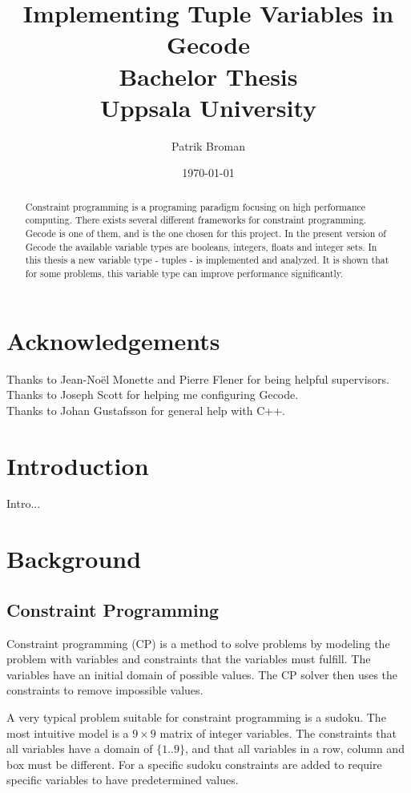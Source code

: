 \documentclass[a4paper,11pt]{article}
\title{\textbf{Implementing Tuple Variables in Gecode \\
	Bachelor Thesis \\
    Uppsala University  \\
  }
}
\author{Patrik Broman}
\date{\today}
\begin{document}
\maketitle

\begin{abstract}
Constraint programming is a programing paradigm focusing on high performance computing. There exists several different frameworks for constraint programming. Gecode is one of them, and is the one chosen for this project. In the present version of Gecode the available variable types are booleans, integers, floats and integer sets. In this thesis a new variable type - tuples - is implemented and analyzed. It is shown that for some problems, this variable type can improve performance significantly.
\end{abstract}

\setcounter{tocdepth}{2}
\tableofcontents

\section*{Acknowledgements}
Thanks to Jean-No\"{e}l Monette and Pierre Flener for being helpful supervisors. \\
Thanks to Joseph Scott for helping me configuring Gecode. \\
Thanks to Johan Gustafsson for general help with C++. \\

\section{Introduction}
Intro...

\section{Background}
\subsection{Constraint Programming}

Constraint programming (CP) is a method to solve problems by modeling the problem with variables and constraints that the variables must fulfill. The variables have an initial domain of possible values. The CP solver then uses the constraints to remove impossible values. 

A very typical problem suitable for constraint programming is a sudoku. The most intuitive model is a $9\times9$ matrix of integer variables. The constraints that all variables have a domain of $\{1..9\}$, and that all variables in a row, column and box must be different. For a specific sudoku constraints are added to require specific variables to have predetermined values.
\end{document}
